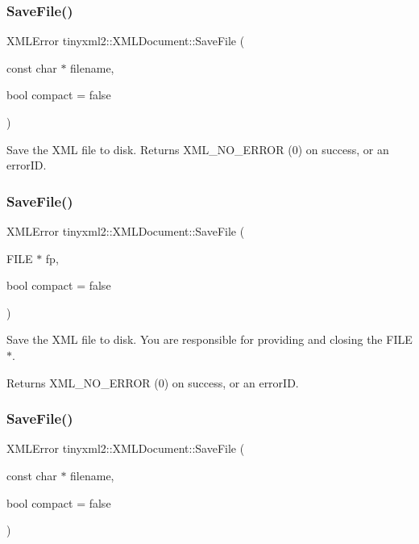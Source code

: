 \subsubsection{\texorpdfstring{Save\+File()}{SaveFile()}\hspace{0.1cm}{\footnotesize\ttfamily [1/4]}}
{\footnotesize\ttfamily X\+M\+L\+Error tinyxml2\+::\+X\+M\+L\+Document\+::\+Save\+File (\begin{DoxyParamCaption}\item[{const char $\ast$}]{filename,  }\item[{bool}]{compact = {\ttfamily false} }\end{DoxyParamCaption})}

Save the X\+ML file to disk. Returns X\+M\+L\+\_\+\+N\+O\+\_\+\+E\+R\+R\+OR (0) on success, or an error\+ID. \mbox{\label{classtinyxml2_1_1XMLDocument_a8b95779479a0035acc67b3a61dfe1b74}} 
\subsubsection{\texorpdfstring{Save\+File()}{SaveFile()}\hspace{0.1cm}{\footnotesize\ttfamily [2/4]}}
{\footnotesize\ttfamily X\+M\+L\+Error tinyxml2\+::\+X\+M\+L\+Document\+::\+Save\+File (\begin{DoxyParamCaption}\item[{F\+I\+LE $\ast$}]{fp,  }\item[{bool}]{compact = {\ttfamily false} }\end{DoxyParamCaption})}

Save the X\+ML file to disk. You are responsible for providing and closing the F\+I\+L\+E$\ast$.

Returns X\+M\+L\+\_\+\+N\+O\+\_\+\+E\+R\+R\+OR (0) on success, or an error\+ID. \mbox{\label{classtinyxml2_1_1XMLDocument_a73ac416b4a2aa0952e841220eb3da18f}} 
\subsubsection{\texorpdfstring{Save\+File()}{SaveFile()}\hspace{0.1cm}{\footnotesize\ttfamily [3/4]}}
{\footnotesize\ttfamily X\+M\+L\+Error tinyxml2\+::\+X\+M\+L\+Document\+::\+Save\+File (\begin{DoxyParamCaption}\item[{const char $\ast$}]{filename,  }\item[{bool}]{compact = {\ttfamily false} }\end{DoxyParamCaption})}

